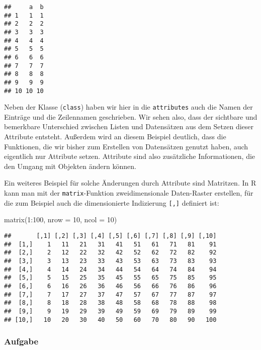\documentclass[
]{book}
\newenvironment{Shaded}{\begin{snugshade}}{\end{snugshade}}
\newcommand{\AttributeTok}[1]{\textcolor[rgb]{0.77,0.63,0.00}{#1}}
\newcommand{\DecValTok}[1]{\textcolor[rgb]{0.00,0.00,0.81}{#1}}
\newcommand{\FunctionTok}[1]{\textcolor[rgb]{0.00,0.00,0.00}{#1}}
\newcommand{\NormalTok}[1]{#1}
\newcommand{\SpecialCharTok}[1]{\textcolor[rgb]{0.00,0.00,0.00}{#1}}
\begin{document}
\begin{verbatim}
##     a  b
## 1   1  1
## 2   2  2
## 3   3  3
## 4   4  4
## 5   5  5
## 6   6  6
## 7   7  7
## 8   8  8
## 9   9  9
## 10 10 10
\end{verbatim}

Neben der Klasse (\texttt{class}) haben wir hier in die \texttt{attributes} auch die Namen der Einträge und die Zeilennamen geschrieben. Wir sehen also, dass der sichtbare und bemerkbare Unterschied zwischen Listen und Datensätzen aus dem Setzen dieser Attribute entsteht. Außerdem wird an diesem Beispiel deutlich, dass die Funktionen, die wir bisher zum Erstellen von Datensätzen genutzt haben, auch eigentlich nur Attribute setzen.
Attribute sind also zusätzliche Informationen, die den Umgang mit Objekten ändern können.

Ein weiteres Beispiel für solche Änderungen durch Attribute sind Matritzen. In R kann man mit der \texttt{matrix}-Funktion zweidimensionale Daten-Raster erstellen, für die zum Beispiel auch die dimensionierte Indizierung \texttt{{[},{]}} definiert ist:

\begin{Shaded}
\begin{Highlighting}[]
\FunctionTok{matrix}\NormalTok{(}\DecValTok{1}\SpecialCharTok{:}\DecValTok{100}\NormalTok{,}
       \AttributeTok{nrow =} \DecValTok{10}\NormalTok{, }
       \AttributeTok{ncol =} \DecValTok{10}\NormalTok{)}
\end{Highlighting}
\end{Shaded}

\begin{verbatim}
##       [,1] [,2] [,3] [,4] [,5] [,6] [,7] [,8] [,9] [,10]
##  [1,]    1   11   21   31   41   51   61   71   81    91
##  [2,]    2   12   22   32   42   52   62   72   82    92
##  [3,]    3   13   23   33   43   53   63   73   83    93
##  [4,]    4   14   24   34   44   54   64   74   84    94
##  [5,]    5   15   25   35   45   55   65   75   85    95
##  [6,]    6   16   26   36   46   56   66   76   86    96
##  [7,]    7   17   27   37   47   57   67   77   87    97
##  [8,]    8   18   28   38   48   58   68   78   88    98
##  [9,]    9   19   29   39   49   59   69   79   89    99
## [10,]   10   20   30   40   50   60   70   80   90   100
\end{verbatim}

\hypertarget{aufgabe-8}{%
\subsubsection{Aufgabe}\label{aufgabe-8}}
\end{document}
